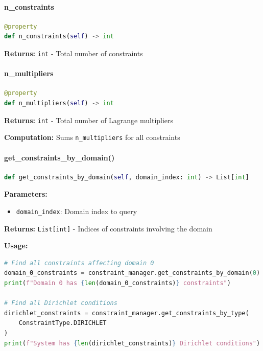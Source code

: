 \paragraph{n\_constraints}\leavevmode
\begin{lstlisting}[language=Python, caption=Number of Constraints Property]
@property
def n_constraints(self) -> int
\end{lstlisting}

\textbf{Returns:} \texttt{int} - Total number of constraints

\paragraph{n\_multipliers}\leavevmode
\begin{lstlisting}[language=Python, caption=Number of Multipliers Property]
@property
def n_multipliers(self) -> int
\end{lstlisting}

\textbf{Returns:} \texttt{int} - Total number of Lagrange multipliers

\textbf{Computation:} Sums \texttt{n\_multipliers} for all constraints

\paragraph{get\_constraints\_by\_domain()}\leavevmode
\begin{lstlisting}[language=Python, caption=Get Constraints by Domain Method]
def get_constraints_by_domain(self, domain_index: int) -> List[int]
\end{lstlisting}

\textbf{Parameters:}
\begin{itemize}
    \item \texttt{domain\_index}: Domain index to query
\end{itemize}

\textbf{Returns:} \texttt{List[int]} - Indices of constraints involving the domain

\textbf{Usage:}
\begin{lstlisting}[language=Python, caption=Query Constraints Usage]
# Find all constraints affecting domain 0
domain_0_constraints = constraint_manager.get_constraints_by_domain(0)
print(f"Domain 0 has {len(domain_0_constraints)} constraints")

# Find all Dirichlet conditions
dirichlet_constraints = constraint_manager.get_constraints_by_type(
    ConstraintType.DIRICHLET
)
print(f"System has {len(dirichlet_constraints)} Dirichlet conditions")
\end{lstlisting}

